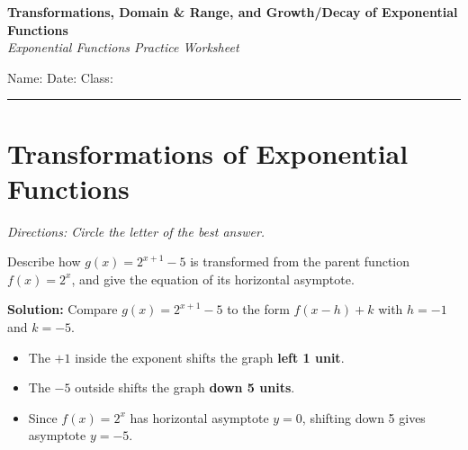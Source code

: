 \documentclass[11pt]{article}
\begin{document}
\begin{center}
  {\LARGE\bfseries Transformations, Domain \& Range, and Growth/Decay of Exponential Functions}\\[4pt]
  {\itshape\color{gray} Exponential Functions Practice Worksheet}
\end{center}

\vspace{6pt}
\noindent
Name: \makebox[2.3in]{\hrulefill} \hfill
Date: \makebox[1.4in]{\hrulefill} \hfill
Class: \makebox[1.2in]{\hrulefill}
\vspace{4pt}
\hrule

\section{Transformations of Exponential Functions}
\textit{Directions: Circle the letter of the best answer.}

\begin{example}
Describe how $g(x) = 2^{x+1} - 5$ is transformed from the parent function $f(x) = 2^x$, and give the equation of its horizontal asymptote.

\textbf{Solution:} Compare $g(x) = 2^{x+1} - 5$ to the form $f(x-h) + k$ with $h = -1$ and $k = -5$.
\begin{itemize}[nosep]
  \item The $+1$ inside the exponent shifts the graph \textbf{left 1 unit}.
  \item The $-5$ outside shifts the graph \textbf{down 5 units}.
  \item Since $f(x)=2^x$ has horizontal asymptote $y=0$, shifting down 5 gives asymptote $\boxed{y=-5}$.
\end{itemize}
\end{example}
\end{document}
